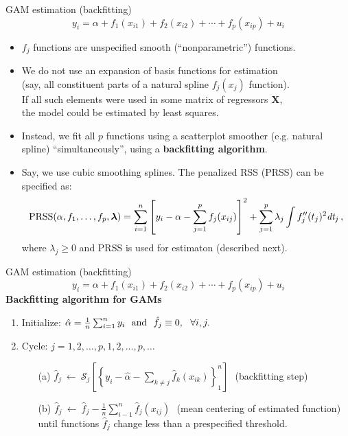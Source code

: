 \documentclass{beamer}
\begin{document}
\begin{frame}{GAM estimation (backfitting)}
\vspace{-0.3cm}
$$ y_i = \alpha + f_1(x_{i1}) + f_2(x_{i2}) + \cdots + f_p(x_{ip}) + u_i$$
\vspace{-0.3cm}
\begin{itemize}
    \item $f_j$ functions are unspecified smooth (``nonparametric'') functions.
    \smallskip
    \item We do not use an expansion of basis functions for estimation \\(say, all constituent parts of a natural spline $f_j(x_{j})$ function). \\If all such elements were used in some matrix of regressors $\bm{X}$, \\the model could be estimated by least squares.
    \smallskip
    \item Instead, we fit all $p$ functions using a scatterplot smoother (e.g. natural spline) ``simultaneously'', using a \textbf{backfitting algorithm}.
    \smallskip
    \item Say, we use cubic smoothing splines. The penalized RSS (PRSS) can be specified as:
    \small{$$\textnormal{PRSS}(\alpha,f_1,\dots,f_p,\bm{\lambda}) = \sum_{i=1}^n \left[y_i - \alpha - \sum_{j=1}^p f_j(x_{ij}) \right]^2 + \sum_{j=1}^p \lambda_j \int f_j''(t_j)^2 \textit{dt}_j\,,$$}
    where $\lambda_j \geq 0$ and PRSS is used for estimaton (described next).
\end{itemize}
\end{frame}
\begin{frame}{GAM estimation (backfitting)}
\vspace{-0.3cm}
$$ y_i = \alpha + f_1(x_{i1}) + f_2(x_{i2}) + \cdots + f_p(x_{ip}) + u_i$$
\textbf{Backfitting algorithm for GAMs}\\ \medskip
\begin{enumerate}
    \item Initialize: $\hat{\alpha}=\frac{1}{n} \sum_{i=1}^n y_i~~\textnormal{and}~~\hat{f}_j \equiv 0,~~\forall i,j.$
    \bigskip
    \item Cycle: $j = 1,2,\dots,p,1,2,\dots,p,\dots$
    \bigskip
    \begin{itemize}
        \item[(a)] $\hat{f}_j~\leftarrow ~ \mathcal{S}_j \left[ \left\lbrace y_i - \hat{\alpha} - \sum_{k \neq j} \hat{f}_k (x_{ik}) \right\rbrace_1^n \right]~~~$(backfitting step)
        \bigskip
        \item[(b)] $\hat{f}_j~\leftarrow ~ \hat{f}_j - \frac{1}{n} \sum_{i-1}^n \hat{f}_j (x_{ij}) ~~~$(mean centering of estimated function)\\
        \bigskip
        until functions $\hat{f}_j$ change less than a prespecified threshold.
    \end{itemize}
\end{enumerate}
\end{frame}
\end{document}
